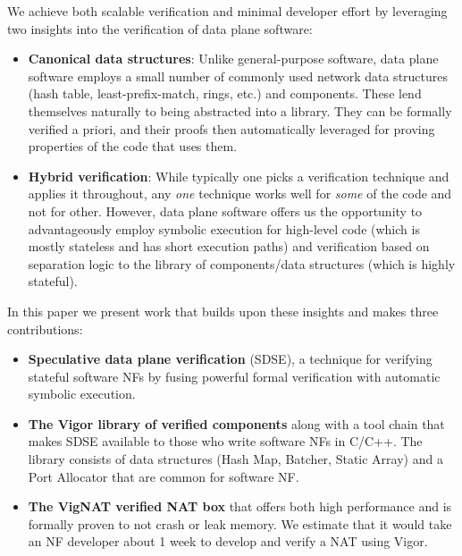 \documentclass[letterpaper,twocolumn,10pt]{article}
\newcommand{\vignat}{{\sc VigNAT}\xspace}
\begin{document}
We achieve both scalable verification and minimal developer effort by leveraging two insights into the verification of data plane software:
\begin{itemize}
    \item {\bf Canonical data structures}: Unlike general-purpose software, data plane software employs a small number of commonly used network data structures (hash table, least-prefix-match, rings, etc.) and components. These lend themselves naturally to being abstracted into a library. They can be formally verified a priori, and their proofs then automatically leveraged for proving properties of the code that uses them.
    \item {\bf Hybrid verification}: While typically one picks a verification technique and applies it throughout, any {\em one} technique works well for {\em some} of the code and not for other. However, data plane software offers us the opportunity to advantageously employ symbolic execution for high-level code (which is mostly stateless and has short execution paths) and verification based on separation logic to the library of components/data structures (which is highly stateful).
     
\end{itemize}

In this paper we present work that builds upon these insights and makes three contributions:
\begin{itemize}
    \item {\bf Speculative data plane verification} (SDSE), a technique for verifying stateful software NFs by fusing powerful formal verification with automatic symbolic execution. %
    \item {\bf The Vigor library of verified components} along with a tool chain that makes SDSE available to those who write software NFs in C/C++. The library consists of data structures (Hash Map, Batcher, Static Array) and a Port Allocator that are common for software NF. %
    \item {\bf The \vignat verified NAT box} that offers both high performance and is formally proven to not crash or leak memory. We estimate that it would take an NF developer about 1 week to develop and verify a NAT using Vigor.
\end{itemize}
\end{document}
